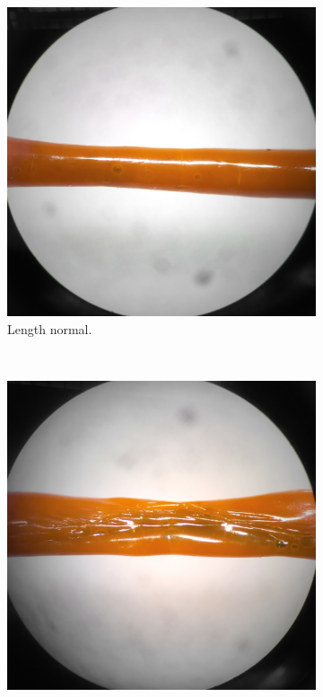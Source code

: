 \begin{figure}[h!]
        \centering
        \begin{subfigure}[b]{0.3\textwidth}
                \includegraphics[width=\textwidth]{./figures/20-og-normal}
                \caption{Length normal.}
                \label{fig:20-og-normal}
        \end{subfigure}%
        ~ %
        \begin{subfigure}[b]{0.3\textwidth}
                \includegraphics[width=\textwidth]{./figures/20-og-defect}

\end{subfigure}
\end{figure}
